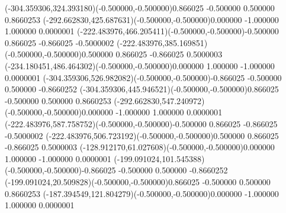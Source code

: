 \ASYalignT(-304.359306,324.393180)(-0.500000,-0.500000){0.866025 -0.500000 0.500000 0.866025}{3}%
\color{ASYcolor}
\fontsize{12.000000}{14.400000}\selectfont
\ASYalignT(-292.662830,425.687631)(-0.500000,-0.500000){0.000000 -1.000000 1.000000 0.000000}{1}%
\color{ASYcolor}
\fontsize{12.000000}{14.400000}\selectfont
\ASYalignT(-222.483976,466.205411)(-0.500000,-0.500000){-0.500000 0.866025 -0.866025 -0.500000}{2}%
\color{ASYcolor}
\fontsize{12.000000}{14.400000}\selectfont
\ASYalignT(-222.483976,385.169851)(-0.500000,-0.500000){0.500000 0.866025 -0.866025 0.500000}{3}%
\color{ASYcolor}
\fontsize{12.000000}{14.400000}\selectfont
\ASYalignT(-234.180451,486.464302)(-0.500000,-0.500000){0.000000 1.000000 -1.000000 0.000000}{1}%
\color{ASYcolor}
\fontsize{12.000000}{14.400000}\selectfont
\ASYalignT(-304.359306,526.982082)(-0.500000,-0.500000){-0.866025 -0.500000 0.500000 -0.866025}{2}%
\color{ASYcolor}
\fontsize{12.000000}{14.400000}\selectfont
\ASYalignT(-304.359306,445.946521)(-0.500000,-0.500000){0.866025 -0.500000 0.500000 0.866025}{3}%
\color{ASYcolor}
\fontsize{12.000000}{14.400000}\selectfont
\ASYalignT(-292.662830,547.240972)(-0.500000,-0.500000){0.000000 -1.000000 1.000000 0.000000}{1}%
\color{ASYcolor}
\fontsize{12.000000}{14.400000}\selectfont
\ASYalignT(-222.483976,587.758752)(-0.500000,-0.500000){-0.500000 0.866025 -0.866025 -0.500000}{2}%
\color{ASYcolor}
\fontsize{12.000000}{14.400000}\selectfont
\ASYalignT(-222.483976,506.723192)(-0.500000,-0.500000){0.500000 0.866025 -0.866025 0.500000}{3}%
\color{ASYcolor}
\fontsize{12.000000}{14.400000}\selectfont
\ASYalignT(-128.912170,61.027608)(-0.500000,-0.500000){0.000000 1.000000 -1.000000 0.000000}{1}%
\color{ASYcolor}
\fontsize{12.000000}{14.400000}\selectfont
\ASYalignT(-199.091024,101.545388)(-0.500000,-0.500000){-0.866025 -0.500000 0.500000 -0.866025}{2}%
\color{ASYcolor}
\fontsize{12.000000}{14.400000}\selectfont
\ASYalignT(-199.091024,20.509828)(-0.500000,-0.500000){0.866025 -0.500000 0.500000 0.866025}{3}%
\color{ASYcolor}
\fontsize{12.000000}{14.400000}\selectfont
\ASYalignT(-187.394549,121.804279)(-0.500000,-0.500000){0.000000 -1.000000 1.000000 0.000000}{1}%
